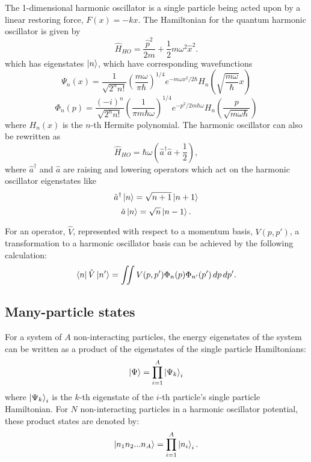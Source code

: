 The 1-dimensional harmonic oscillator is a single particle being acted upon by a linear restoring force, $F(x) = - k x$. The Hamiltonian for the quantum harmonic oscillator is given by
\begin{equation}
\hat{H}_{HO} = \frac{\hat{p}^2}{2m} + \frac{1}{2}m\omega^2\hat{x}^2.
\end{equation}
which has eigenstates $\ket{n}$, which have corresponding wavefunctions
\begin{equation}
\Psi_n(x) = \frac{1}{\sqrt{2^n n!}}\left(\frac{m \omega}{\pi \hbar}\right)^{1/4}e^{-m \omega x^2 / 2 \hbar} H_n\left(\sqrt{\frac{m \omega}{\hbar}}x\right)
\end{equation}
\begin{equation}
\Phi_n(p) = \frac{(-i)^n}{\sqrt{2^n n!}}\left(\frac{1}{\pi m \hbar \omega}\right)^{1/4}e^{-p^2 / 2 m \hbar \omega} H_n\left(\frac{p}{\sqrt{m \omega \hbar}}\right)
\end{equation}
where $H_n(x)$ is the $n$-th Hermite polynomial. The harmonic oscillator can also be rewritten as
\begin{equation}
\hat{H}_{HO} = \hbar \omega \left(\hat{a}^\dagger \hat{a} + \frac{1}{2}\right),
\end{equation}
where $\hat{a}^\dagger$ and $\hat{a}$ are raising and lowering operators which act on the harmonic oscillator eigenstates like
\begin{equation}
\hat{a}^\dagger\ket{n} = \sqrt{n + 1}\ket{n+1}
\end{equation}
\begin{equation}
\hat{a}\ket{n} = \sqrt{n}\ket{n-1}.
\end{equation}

For an operator, $\hat{V}$, represented with respect to a momentum basis, $V(p, p')$, a transformation to a harmonic oscillator basis can be achieved by the following calculation:
\begin{equation}
\bra{n}\hat{V}\ket{n'} = \iint V(p, p') \Phi_n(p) \Phi_{n'}(p') \,dp\,dp'.
\end{equation}

\subsection{Many-particle states}

For a system of $A$ non-interacting particles, the energy eigenstates of the system can be written as a product of the eigenstates of the single particle Hamiltonians:
\begin{equation}
\ket{\Psi} = \prod_{i=1}^{A}\ket{\Psi_k}_i
\end{equation}
where $\ket{\Psi_k}_i$ is the $k$-th eigenstate of the $i$-th particle's single particle Hamiltonian. For $N$ non-interacting particles in a harmonic oscillator potential, these product states are denoted by:
\begin{equation}
\ket{n_1 n_2 ... n_A} = \prod_{i=1}^{A}\ket{n_i}_i.
\end{equation}



